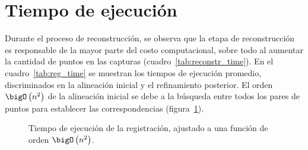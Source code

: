 
	\section{Tiempo de ejecución}
		Durante el proceso de reconstrucción, se observa que la etapa de reconstrucción
		es responsable de la mayor parte del costo computacional, sobre todo al aumentar
		la cantidad de puntos en las capturas (cuadro~\ref{tab:reconstr_time}).
		En el cuadro~\ref{tab:reg_time} se muestran
		los tiempos de ejecución promedio, discriminados en la alineación
		inicial y el refinamiento posterior.
		El orden $\bigO\left(n^2\right)$ de la alineación inicial se debe a la búsqueda
		entre todos los pares de puntos para establecer las correspondencias (figura~\ref{fig:registration_order}).
		

		

		\begin{figure}
			\centering
			
			\caption{\label{fig:registration_order}Tiempo de ejecución de la registración, ajustado a una función de orden $\bigO\left(n^2\right)$.}
		\end{figure}
